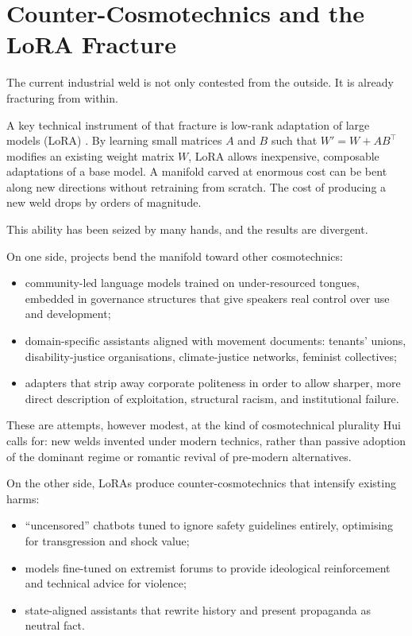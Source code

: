 \section{Counter-Cosmotechnics and the LoRA Fracture}

The current industrial weld is not only contested from the outside. It is already fracturing from within.

A key technical instrument of that fracture is low-rank adaptation of large models (LoRA) \cite{hu2021lora}. By learning small matrices $A$ and $B$ such that $W' = W + AB^\top$ modifies an existing weight matrix $W$, LoRA allows inexpensive, composable adaptations of a base model. A manifold carved at enormous cost can be bent along new directions without retraining from scratch. The cost of producing a new weld drops by orders of magnitude.

This ability has been seized by many hands, and the results are divergent.

On one side, projects bend the manifold toward other cosmotechnics:

\begin{itemize}
  \item community-led language models trained on under-resourced tongues, embedded in governance structures that give speakers real control over use and development;
  \item domain-specific assistants aligned with movement documents: tenants' unions, disability-justice organisations, climate-justice networks, feminist collectives;
  \item adapters that strip away corporate politeness in order to allow sharper, more direct description of exploitation, structural racism, and institutional failure.
\end{itemize}

These are attempts, however modest, at the kind of cosmotechnical plurality Hui calls for: new welds invented under modern technics, rather than passive adoption of the dominant regime or romantic revival of pre-modern alternatives.

On the other side, LoRAs produce counter-cosmotechnics that intensify existing harms:

\begin{itemize}
  \item ``uncensored'' chatbots tuned to ignore safety guidelines entirely, optimising for transgression and shock value;
  \item models fine-tuned on extremist forums to provide ideological reinforcement and technical advice for violence;
  \item state-aligned assistants that rewrite history and present propaganda as neutral fact.
\end{itemize}

